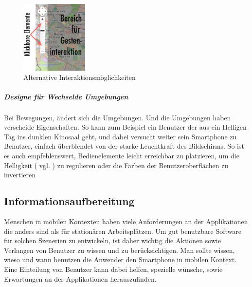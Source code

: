 \begin{figure}
	\begin{center}
	
	\includegraphics[width=0.3\textwidth]{img/NUIbsp.png}
	\caption{Alternative Interaktionsmöglichkeiten}\label{fig:nuibsp}
\end{center}
\end{figure}

\subparagraph{Designe für Wechselde Umgebungen} %
\label{subp:designe_f_r_au_eneinsatz}

Bei Bewegungen, ändert sich die Umgebungen. Und die Umgebungen haben verscheide Eigenschaften. So kann zum Beispiel ein Benutzer der aus ein Helligen Tag ins dunklen Kinosaal geht, und dabei versucht weiter sein Smartphone zu Benutzer, einfach überblendet von der starke Leuchtkraft des Bildschirms. So ist es auch empfehlenswert, Bedienelemente leicht erreichbar zu platzieren, um die Helligkeit ( vgl. \cite[ff Seite 418]{mobileInteraces}) zu regulieren oder die Farben der Benutzeroberflächen zu invertieren

\subsection{Informationsaufbereitung}
\label{sec:Informationsaufbereitung}


Menschen in mobilen Kontexten haben viele Anforderungen an der Applikationen die anders sind als für stationären Arbeitsplätzen. Um gut benutzbare Software für solchen Szenerien zu entwickeln, ist daher wichtig die Aktionen sowie Verlangen von Benutzer zu wissen und zu berücksichtigen. Man sollte wissen, wieso und wann benutzen die Anwender den Smartphone in mobilen Kontext. Eine Einteilung von Benutzer kann dabei helfen, spezielle wünsche, sowie Erwartungen an der Applikationen herauszufinden.

